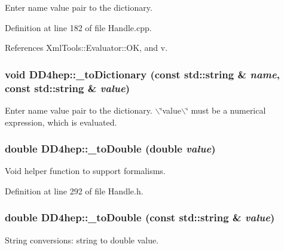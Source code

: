 Enter name value pair to the dictionary. 

Definition at line 182 of file Handle.cpp.

References XmlTools::Evaluator::OK, and v.\hypertarget{group___d_d4_h_e_p___g_e_o_m_e_t_r_y_gaaf303de968d2679957961df3928767c1}{
\subsubsection[{\_\-toDictionary}]{\setlength{\rightskip}{0pt plus 5cm}void DD4hep::\_\-toDictionary (const std::string \& {\em name}, \/  const std::string \& {\em value})}}
\label{group___d_d4_h_e_p___g_e_o_m_e_t_r_y_gaaf303de968d2679957961df3928767c1}


Enter name value pair to the dictionary. $\backslash$\char`\"{}value$\backslash$\char`\"{} must be a numerical expression, which is evaluated. \hypertarget{group___d_d4_h_e_p___g_e_o_m_e_t_r_y_ga3d960b4bfc48c6c6bce83e0021da377f}{
\subsubsection[{\_\-toDouble}]{\setlength{\rightskip}{0pt plus 5cm}double DD4hep::\_\-toDouble (double {\em value})}}
\label{group___d_d4_h_e_p___g_e_o_m_e_t_r_y_ga3d960b4bfc48c6c6bce83e0021da377f}


Void helper function to support formalisms. 

Definition at line 292 of file Handle.h.\hypertarget{group___d_d4_h_e_p___g_e_o_m_e_t_r_y_ga76e95737ef946f88e7477f69f677a4e2}{
\subsubsection[{\_\-toDouble}]{\setlength{\rightskip}{0pt plus 5cm}double DD4hep::\_\-toDouble (const std::string \& {\em value})}}
\label{group___d_d4_h_e_p___g_e_o_m_e_t_r_y_ga76e95737ef946f88e7477f69f677a4e2}


String conversions: string to double value. 

